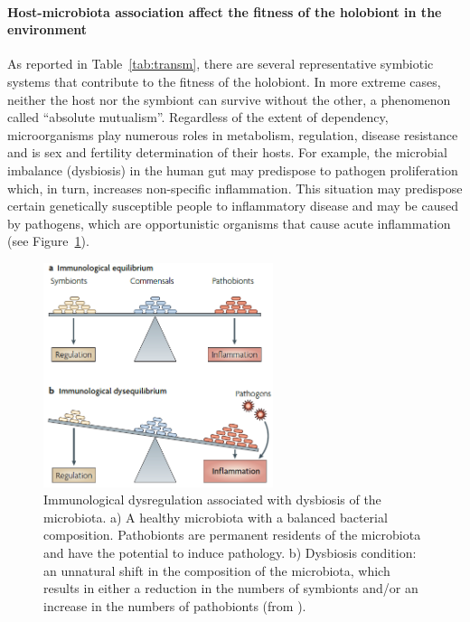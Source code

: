 \paragraph{Host-microbiota association affect the fitness of the holobiont in the environment}
As reported in Table~\ref{tab:transm}, there are several representative symbiotic systems that contribute to the fitness of the holobiont. In more extreme cases, neither the host nor the symbiont can survive without the other, a phenomenon called ``absolute mutualism''. Regardless of the extent of dependency, microorganisms play numerous roles in metabolism, regulation, disease resistance and is sex and fertility determination of their hosts. For example, the microbial imbalance (dysbiosis) in the human gut may predispose to pathogen proliferation which, in turn, increases non-specific inflammation. This situation may predispose certain genetically susceptible people to inflammatory disease and may be caused by pathogens, which are opportunistic organisms that cause acute inflammation \cite{round2009gut} (see Figure~\ref{fig:dysb}).\\
\begin{figure}[!tb]
	\centering
	\includegraphics[width=0.6\textwidth]{./figures/Introduction/gut_dysbiosis}
  	\caption{Immunological dysregulation associated with dysbiosis of the microbiota. a) A healthy microbiota with a balanced bacterial composition. Pathobionts are permanent residents of the microbiota and have the potential to induce pathology. b) Dysbiosis condition: an unnatural shift in the composition of the microbiota, which results in either a reduction in the numbers of symbionts and/or an increase in the numbers of pathobionts (from \cite{round2009gut}). \label{fig:dysb}}
\end{figure}
